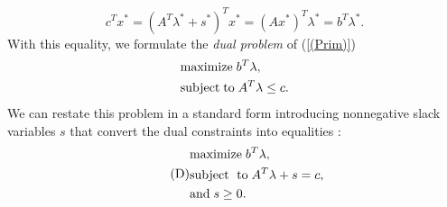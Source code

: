\documentclass[a4paper,10 pt,titlepage,twoside]{report}
\theoremstyle{plain}
\theoremstyle{definition}
\theoremstyle{remark}
\begin{document}
\begin{equation}\label{Dual}\tag{2.7}
	c^{T}x^{*}=\left(A^{T}\lambda^{*}+s^{*}\right)^{T}x^{*}=\left(Ax^{*}\right)^{T}\lambda^{*}=b^{T}\lambda^{*}.
\end{equation}
With this equality, we formulate the \textit{dual problem} of (\ref{(Prim)})
\begin{equation*}
\begin{split}
&\text{maximize\;} b^{T}\lambda,\\
&\text{subject\;to\;}A^{T}\lambda \leq c.
\end{split}
\end{equation*} 
We can restate this problem in a standard form introducing nonnegative slack variables $s$ that convert the dual constraints into equalities :
\begin{equation}\tag{D}\label{(Dual)}
\begin{split}
&\text{maximize\;}b^{T}\lambda,\\
&\text{subject\; to\;}A^{T}\lambda+s=c,\\ &\text{and\;} s\geq0.
\end{split}
\end{equation}
\end{document}
